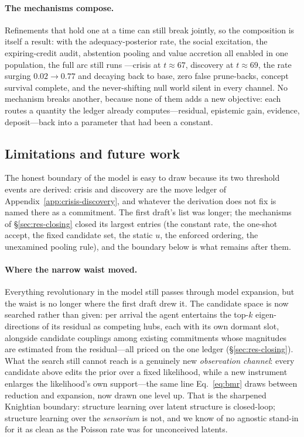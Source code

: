 \documentclass[11pt]{article}
\begin{document}
\paragraph{The mechanisms compose.}
Refinements that hold one at a time can still break jointly, so the composition is itself a
result: with the adequacy-posterior rate, the social excitation, the expiring-credit audit,
abstention pooling and value accretion all enabled in one population, the full arc still runs
---crisis at $t\approx67$, discovery at $t\approx69$, the rate surging $0.02\to0.77$ and decaying
back to base, zero false prune-backs, concept survival complete, and the never-shifting null
world silent in every channel. No mechanism breaks another, because none of them adds a new
objective: each routes a quantity the ledger already computes---residual, epistemic gain,
evidence, deposit---back into a parameter that had been a constant.

\subsection{Limitations and future work}
\label{sec:res-staircase}

The honest boundary of the model is easy to draw because its two threshold events are derived:
crisis and discovery are the move ledger of Appendix~\ref{app:crisis-discovery}, and whatever the
derivation does not fix is named there as a commitment. The first draft's list was longer; the
mechanisms of \S\ref{sec:res-closing} closed its largest entries (the constant rate, the one-shot
accept, the fixed candidate set, the static $u$, the enforced ordering, the unexamined pooling
rule), and the boundary below is what remains after them.

\paragraph{Where the narrow waist moved.}
Everything revolutionary in the model still passes through model expansion, but the waist is no
longer where the first draft drew it. The candidate space is now searched rather than given: per
arrival the agent entertains the top-$k$ eigen-directions of its residual as competing hubs, each
with its own dormant slot, alongside candidate couplings among existing commitments whose
magnitudes are estimated from the residual---all priced on the one ledger
(\S\ref{sec:res-closing}). What the search still cannot reach is a genuinely new
\emph{observation channel}: every candidate above edits the prior over a fixed likelihood, while
a new instrument enlarges the likelihood's own support---the same line Eq.~\eqref{eq:bmr} draws
between reduction and expansion, now drawn one level up. That is the sharpened Knightian
boundary: structure learning over latent structure is closed-loop; structure learning over the
\emph{sensorium} is not, and we know of no agnostic stand-in for it as clean as the Poisson rate
was for unconceived latents.
\end{document}
